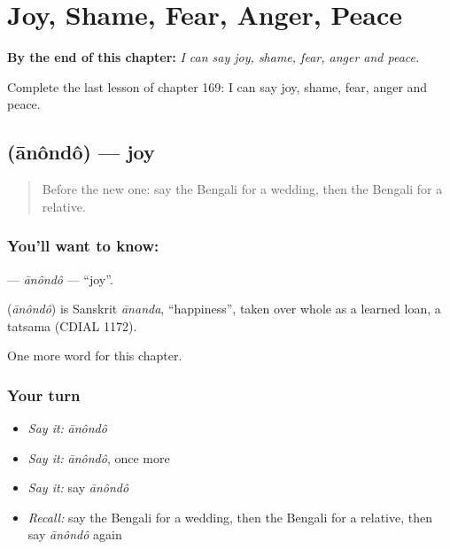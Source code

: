 
\chapter{Joy, Shame, Fear, Anger, Peace}
\label{ch:bn-joy-shame-fear-anger-peace}

\begin{chapteropening}
\textbf{By the end of this chapter:} \emph{I can say joy, shame, fear, anger and peace.}

Complete the last lesson of chapter 169: I can say joy, shame, fear, anger and peace.
\end{chapteropening}

\section[\texorpdfstring{\bn{আনন্দ} (ānôndô)}{আনন্দ (ānôndô)}]{ (ānôndô) — joy}

\label{lesson:BN-C169-anondo}



\begin{quote}
Before the new one: say the Bengali for a wedding, then the Bengali for a relative.
\end{quote}

\subsection*{You'll want to know: }
\textbf{} — \emph{ānôndô} — \textquotedblleft{}joy\textquotedblright{}.

\begin{cousinweb}
\textbf{} (\emph{ānôndô}) is Sanskrit \emph{ānanda}, \textquotedblleft{}happiness\textquotedblright{}, taken over whole as a learned loan, a tatsama (CDIAL 1172).
\end{cousinweb}

\begin{grammarlens}[title={What you've built}]
One more word for this chapter.
\end{grammarlens}

\subsection*{Your turn}
\begin{itemize}
\raggedright
  \item \emph{Say it:} \emph{ānôndô}
  \item \emph{Say it:} \emph{ānôndô}, once more
  \item \emph{Say it:} say \emph{ānôndô}
  \item \emph{Recall:} say the Bengali for a wedding, then the Bengali for a relative, then say \emph{ānôndô} again
\end{itemize}

